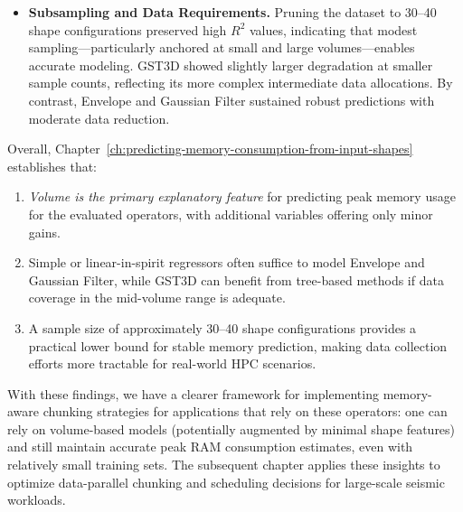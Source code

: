 \begin{itemize}
    \item \textbf{Subsampling and Data Requirements.}
    Pruning the dataset to 30–40 shape configurations preserved high $R^2$ values, indicating that modest sampling—particularly anchored at small and large volumes—enables accurate modeling.
    \ac{GST3D} showed slightly larger degradation at smaller sample counts, reflecting its more complex intermediate data allocations.
    By contrast, Envelope and Gaussian Filter sustained robust predictions with moderate data reduction.
\end{itemize}

Overall, Chapter~\ref{ch:predicting-memory-consumption-from-input-shapes} establishes that:
\begin{enumerate}
    \item \emph{Volume is the primary explanatory feature} for predicting peak memory usage for the evaluated operators, with additional variables offering only minor gains.
    \item Simple or linear-in-spirit regressors often suffice to model Envelope and Gaussian Filter, while \ac{GST3D} can benefit from tree-based methods if data coverage in the mid-volume range is adequate.
    \item A sample size of approximately 30–40 shape configurations provides a practical lower bound for stable memory prediction, making data collection efforts more tractable for real-world \ac{HPC} scenarios.
\end{enumerate}

With these findings, we have a clearer framework for implementing memory-aware chunking strategies for applications that rely on these operators: one can rely on volume-based models (potentially augmented by minimal shape features) and still maintain accurate peak \ac{RAM} consumption estimates, even with relatively small training sets.
The subsequent chapter applies these insights to optimize data-parallel chunking and scheduling decisions for large-scale seismic workloads.